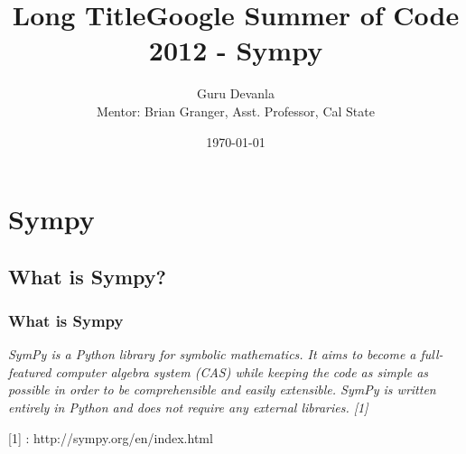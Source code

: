 \documentclass[dvips]{beamer}
\begin{document}
\title[Short Title]{Long Title}
\title[GSoC 2012 Sympy]{Google Summer of Code 2012 - Sympy}
\author[Guru Devanla] {Guru Devanla \\ Mentor: Brian Granger, Asst. Professor, Cal State}


\date[Google GSOC Meetup,May 2012]{\today}

\begin{frame}
\titlepage
\end{frame}




\frame{\tableofcontents}

\section{Sympy}
\subsection{What is Sympy?}

\begin{frame}
\frametitle{What is Sympy}

\textit{SymPy is a Python library for symbolic mathematics. It aims to become
  a full-featured computer algebra system (CAS) while keeping the code as
  simple as possible in order to be comprehensible and easily
  extensible. SymPy is written entirely in Python and does not require any
  external libraries. [1]}


[1] : http://sympy.org/en/index.html

\end{frame}
\end{document}
